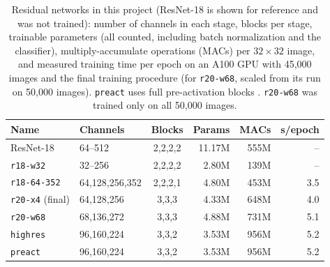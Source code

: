 \documentclass[letterpaper]{article}
\begin{document}
\begin{table}[t]
\centering
\footnotesize
\setlength{\tabcolsep}{2.2pt}
\begin{tabular}{@{}llcrrr@{}}
\toprule
Name & Channels & Blocks & Params & MACs & s/epoch \\
\midrule
ResNet-18 & 64--512 & 2,2,2,2 & 11.17M & 555M & -- \\
\texttt{r18-w32} & 32--256 & 2,2,2,2 & 2.80M & 139M & -- \\
\texttt{r18-64-352} & 64,128,256,352 & 2,2,2,1 & 4.80M & 453M & 3.5 \\
\texttt{r20-x4} (final) & 64,128,256 & 3,3,3 & 4.33M & 648M & 4.0 \\
\texttt{r20-w68} & 68,136,272 & 3,3,3 & 4.88M & 731M & 5.1 \\
\texttt{highres} & 96,160,224 & 3,3,2 & 3.53M & 956M & 5.2 \\
\texttt{preact} & 96,160,224 & 3,3,2 & 3.53M & 956M & 5.2 \\
\bottomrule
\end{tabular}
\caption{Residual networks in this project (ResNet-18 is shown for reference and was not trained): number of channels in each stage, blocks per stage, trainable parameters
(all counted, including batch normalization and the classifier), multiply-accumulate operations (MACs) per $32{\times}32$
image, and measured training time per epoch on an A100 GPU with 45,000 images and the final training procedure (for
\texttt{r20-w68}, scaled from its run on 50,000 images). \texttt{preact} uses full pre-activation blocks
\cite{he2016identity}. \texttt{r20-w68} was trained only on all 50,000 images.}
\label{tab:archs}
\end{table}
\end{document}
